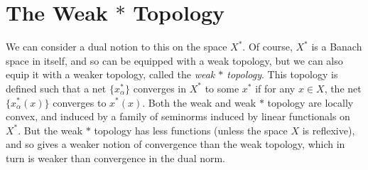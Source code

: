 \begin{comment}
\begin{example}
    The weak topology on $X$ is rarely equal to the original topology on $X$, except in degenerate circumstances. For instance, if we consider $e_n \in l_p$, for $1 < p < \infty$, then $\| e_n - e_m \| = 1$, so $e_n$ does not converge, yet if we consider any element $f \in l_q$ of the dual space, then $\langle f, e_n \rangle = f(n)$, which converges to zero as $n \to \infty$. Thus $e_n$ converges to zero in the weak topology. In $l_1$, $e_n$ does not converge at all, because the function $f(n) = (-1)^n$ is in $l_\infty$, and $\langle f, e_n \rangle = (-1)^n$ does not converge. It is important to note that the weak $*$ topology depends on the predual we are using. If we consider $l_1 = c_0^*$, then the $e_n$ converges to zero in the weak $*$ topology, yet if we consider $l_1$ as $c^*$, then the $e_n$ do not converge in the induced weak $*$ topology.

    The weak topology on a space is rarely first countable. If $A = \{ \sqrt{n} e_n : n \in \mathbf{N} \}$ is viewed as a subset of $l_2$, then 0 is contained in the weak closure of $A$, because if $\varepsilon > 0$ and we are given a finite set of sequences $\{ a_n^k \}_{n \in \mathbf{N}}$, for $1 \leq k \leq K$ and, for any $n$, there is $k_n$ such that $|a_n^{k_n}| \sqrt{n} > \varepsilon$, and if we consider the sum $\sum_k |a_n^k| \in l^2$, then
    \[ \sum_n \left|\sum_k |a_n^k| \right|^2 \geq \sum_n |a_n^{k_n}|^2 \geq \varepsilon \sum \frac{1}{n} = \infty \]
    so there must be an element of $A$ in each $U_{\varepsilon, \{ a_n^1 \}, \dots, \{ a_n^K \}}$, and hence $0$ is in the weak closure of $A$. However, 0 is not the weak limit of any sequence of elements in $A$, for
    \[ \sum_{n = 0}^\infty \frac{e_n}{n} \in l_2 \]
    and if we consider any sequence $\sqrt{n_i} e_{n_i}$ that converges weakly to zero, then we find that $(n_i)^{-1/2}$ converges to zero, hence $n_i \to \infty$. But then the sequence is not norm bounded, and hence cannot converge!
\end{example}
\end{comment}

\section{The Weak $*$ Topology}

We can consider a dual notion to this on the space $X^*$. Of course, $X^*$ is a Banach space in itself, and so can be equipped with a weak topology, but we can also equip it with a weaker topology, called the \emph{weak $*$ topology}. This topology is defined such that a net $\{ x_\alpha^* \}$ converges in $X^*$ to some $x^*$ if for any $x \in X$, the net $\{ x_\alpha^*(x) \}$ converges to $x^*(x)$. Both the weak and weak $*$ topology are locally convex, and induced by a family of seminorms induced by linear functionals on $X^*$. But the weak $*$ topology has less functions (unless the space $X$ is reflexive), and so gives a weaker notion of convergence than the weak topology, which in turn is weaker than convergence in the dual norm.

